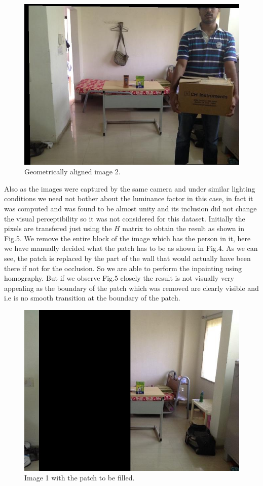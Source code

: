 \documentclass[conference]{IEEEtran}
\begin{document}
\begin{figure}
  \includegraphics[width=\linewidth]{h.jpg}
  \caption{Geometrically aligned image 2.}
  \label{fig:i3}
\end{figure}
	Also as the images were captured by the same camera and under similar lighting conditions we need not bother about the luminance factor in this case, in fact it was computed and was found to be almost unity and its inclusion did not change the visual perceptibility so it was not considered for this dataset. Initially the pixels are transfered just using the $H$ matrix to obtain the result as shown in Fig.5. We remove the entire block of the image which has the person in it, here we have manually decided what the patch has to be as shown in Fig.4. As we can see, the patch is replaced by the part of the wall that would actually have been there if not for the occlusion. So we are able to perform the inpainting using homography. But if we observe Fig.5 closely the result is not visually very appealing as the boundary of the patch which was removed are clearly visible and i.e is no smooth transition at the boundary of the patch. 
\begin{figure}
  \includegraphics[width=\linewidth]{patch.jpg}
  \caption{Image 1 with the patch to be filled.}
  \label{fig:i4}
\end{figure}
\end{document}
